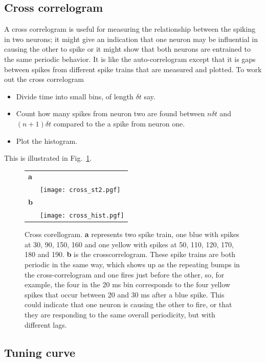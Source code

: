 \documentclass[11pt,a4paper]{scrartcl}
\begin{document}
\subsection*{Cross correlogram}
A cross correlogram is useful for measuring the relationship between
the spiking in two neurons; it might give an indication that one
neuron may be influential in causing the other to spike or it might
show that both neurons are entrained to the same periodic behavior. It
is like the auto-correlogram except that it is gaps between spikes
from different spike trains that are measured and plotted. To work out the cross correlogram
\begin{itemize}
\item Divide time into small bins, of length $\delta t$ say. 
\item Count how many spikes from neuron two are found between $n\delta
  t$ and $(n+1)\delta t$ compared to the a spike from neuron one.
\item Plot the histogram.
\end{itemize}
This is illustrated in Fig.~\ref{cross}.


\begin{figure}
\begin{center}
\begin{tabular}{ll}
\textbf{a}&\\
&\texttt{[image: cross\_st2.pgf]}\\[1cm]
\textbf{b}&\\
&\texttt{[image: cross\_hist.pgf]}
\end{tabular}
\end{center}
\caption{Cross corellogram. \textbf{a} represents two spike train, one
  blue with spikes at 30, 90, 150, 160 and one yellow with spikes at 50, 110,
  120, 170, 180 and 190. \textbf{b} is the crosscorrelogram. These spike
  trains are both periodic in the same way, which shows up as the
  repeating bumps in the cross-correlogram and one fires just before
  the other, so, for example, the four in the 20 ms bin corresponds to
  the four yellow spikes that occur between 20 and 30 ms after a blue
  spike. This could indicate that one neuron is causing the other to
  fire, or that they are responding to the same overall periodicity,
  but with different lags.\label{cross}}
\end{figure}

\subsection*{Tuning curve}
\end{document}
